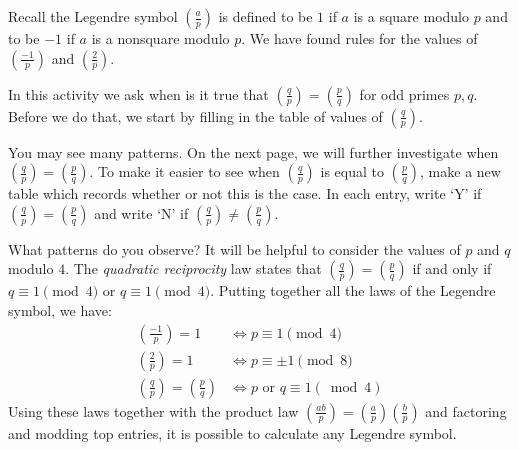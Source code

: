 \documentclass[12pt]{exam}
\begin{document}
\begin{questions}
  \question Recall the Legendre symbol $(\frac ap)$ is defined to be $1$ if $a$ is a square modulo $p$ and to be $-1$ if $a$ is a nonsquare modulo $p$. We have found rules for the values of $(\frac{-1}{p})$ and $(\frac{2}{p})$.
  
  In this activity we ask when is it true that $(\frac qp)=(\frac pq)$ for odd primes $p,q$. Before we do that, we start by filling in the table of values of $(\frac qp)$.
  \begin{center}
  \end{center}
  You may see many patterns. On the next page, we will further investigate when $(\frac qp)=(\frac pq)$.
  \newpage
  \question To make it easier to see when $(\frac qp)$ is equal to $(\frac pq)$, make a new table which records whether or not this is the case. In each entry, write `Y' if $(\frac qp)=(\frac pq)$ and write `N' if $(\frac qp)\neq(\frac pq)$.
  \begin{center}
  \end{center}
  What patterns do you observe? It will be helpful to consider the values of $p$ and $q$ modulo $4$.
  \newpage
  \question The \emph{quadratic reciprocity} law states that $(\frac qp)=(\frac pq)$ if and only if $q\equiv1\pmod{4}$ or $q\equiv1\pmod{4}$. Putting together all the laws of the Legendre symbol, we have:
  \begin{align*}
    \left(\frac{-1}p\right)=1\quad&\iff p\equiv1\pmod{4}\\
    \left(\frac2p\right)=1\quad&\iff p\equiv\pm1\pmod{8}\\
    \left(\frac qp\right)=\left(\frac pq\right)&\iff p\text{ or }q\equiv1(\bmod4)
  \end{align*}
  Using these laws together with the product law $(\frac{ab}{p})=(\frac ap)(\frac bp)$ and factoring and modding top entries, it is possible to calculate any Legendre symbol.
  

\end{questions}
\end{document}

